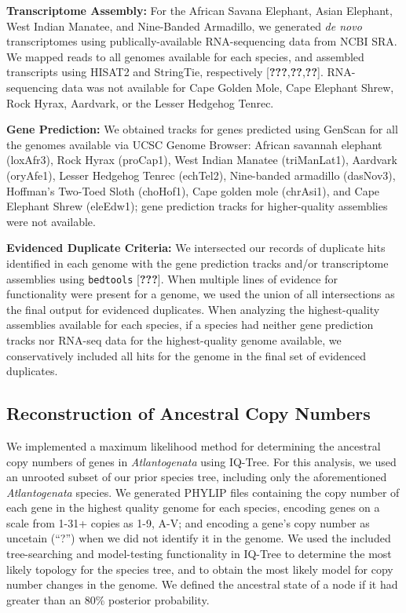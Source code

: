 \documentclass[10pt,letterpaper]{article}
\begin{document}
\textbf{Transcriptome Assembly:} For the African Savana Elephant, Asian
Elephant, West Indian Manatee, and Nine-Banded Armadillo, we generated
\emph{de novo} transcriptomes using publically-available RNA-sequencing
data from NCBI SRA. We mapped reads to all genomes available for each
species, and assembled transcripts using HISAT2 and StringTie,
respectively {[}{\textbf{???}},{\textbf{??}},{\textbf{??}}{]}.
RNA-sequencing data was not available for Cape Golden Mole, Cape
Elephant Shrew, Rock Hyrax, Aardvark, or the Lesser Hedgehog Tenrec.

\textbf{Gene Prediction:} We obtained tracks for genes predicted using
GenScan for all the genomes available via UCSC Genome Browser: African
savannah elephant (loxAfr3), Rock Hyrax (proCap1), West Indian Manatee
(triManLat1), Aardvark (oryAfe1), Lesser Hedgehog Tenrec (echTel2),
Nine-banded armadillo (dasNov3), Hoffman's Two-Toed Sloth (choHof1),
Cape golden mole (chrAsi1), and Cape Elephant Shrew (eleEdw1); gene
prediction tracks for higher-quality assemblies were not available.

\textbf{Evidenced Duplicate Criteria:} We intersected our records of
duplicate hits identified in each genome with the gene prediction tracks
and/or transcriptome assemblies using \texttt{bedtools}
{[}{\textbf{???}}{]}. When multiple lines of evidence for functionality
were present for a genome, we used the union of all intersections as the
final output for evidenced duplicates. When analyzing the
highest-quality assemblies available for each species, if a species had
neither gene prediction tracks nor RNA-seq data for the highest-quality
genome available, we conservatively included all hits for the genome in
the final set of evidenced duplicates.

\hypertarget{reconstruction-of-ancestral-copy-numbers}{%
\subsection{Reconstruction of Ancestral Copy
Numbers}\label{reconstruction-of-ancestral-copy-numbers}}

We implemented a maximum likelihood method for determining the ancestral
copy numbers of genes in \emph{Atlantogenata} using IQ-Tree. For this
analysis, we used an unrooted subset of our prior species tree,
including only the aforementioned \emph{Atlantogenata} species. We
generated PHYLIP files containing the copy number of each gene in the
highest quality genome for each species, encoding genes on a scale from
1-31+ copies as 1-9, A-V; and encoding a gene's copy number as uncetain
(``?'') when we did not identify it in the genome. We used the included
tree-searching and model-testing functionality in IQ-Tree to determine
the most likely topology for the species tree, and to obtain the most
likely model for copy number changes in the genome. We defined the
ancestral state of a node if it had greater than an 80\% posterior
probability.
\end{document}
